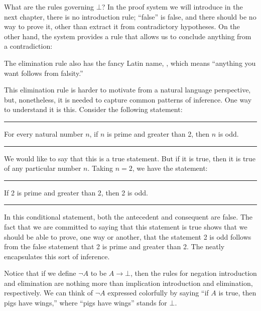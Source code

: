 \documentclass[letterpaper,10pt,english]{sphinxmanual}
\begin{document}
\sphinxAtStartPar
What are the rules governing \(\bot\)? In the proof system we will introduce in the next chapter, there is no introduction rule; “false” is false, and there should be no way to prove it, other than extract it from contradictory hypotheses. On the other hand, the system provides a rule that allows us to conclude anything from a contradiction:



\begin{center}
\AXM{\bot}
\DP
\end{center}

\sphinxAtStartPar
The elimination rule also has the fancy Latin name, , which means “anything you want follows from falsity.”

\sphinxAtStartPar
This elimination rule is harder to motivate from a natural language perspective, but, nonetheless, it is needed to capture common patterns of inference. One way to understand it is this. Consider the following statement:


\bigskip\hrule\bigskip


\sphinxAtStartPar
For every natural number \(n\), if \(n\) is prime and greater than 2, then \(n\) is odd.


\bigskip\hrule\bigskip


\sphinxAtStartPar
We would like to say that this is a true statement. But if it is true, then it is true of any particular number \(n\). Taking \(n = 2\), we have the statement:


\bigskip\hrule\bigskip


\sphinxAtStartPar
If 2 is prime and greater than 2, then 2 is odd.


\bigskip\hrule\bigskip


\sphinxAtStartPar
In this conditional statement, both the antecedent and consequent are false. The fact that we are committed to saying that this statement is true shows that we should be able to prove, one way or another, that the statement 2 is odd follows from the false statement that 2 is prime and greater than 2. The  neatly encapsulates this sort of
inference.

\sphinxAtStartPar
Notice that if we define \(\neg A\) to be \(A \to \bot\), then the rules for negation introduction and elimination are nothing more than implication introduction and elimination, respectively. We can think of \(\neg A\) expressed colorfully by saying “if \(A\) is true, then pigs have wings,” where “pigs have wings” stands for \(\bot\).
\end{document}

